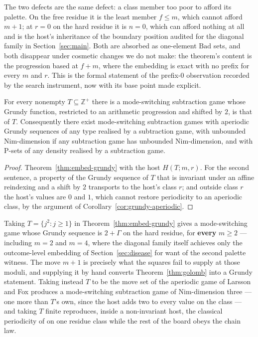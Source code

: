 \begin{remark}\label{rem:two-defects}
The two defects are the same defect: a class member too poor to afford
its palette. On the free residue it is the least member $f \le m$, which
cannot afford $m+1$; at $r = 0$ on the hard residue it is $n = 0$, which
can afford nothing at all and is the host's inheritance of the boundary
position audited for the diagonal family in Section~\ref{sec:main}. Both
are absorbed as one-element $\mathrm{Bad}$ sets, and both disappear under
cosmetic changes we do not make: the theorem's content is the progression
based at $f + m$, where the embedding is exact with no prefix for every
$m$ and $r$. This is the formal statement of the prefix-$0$ observation
recorded by the search instrument, now with its base point made explicit.
\end{remark}

\begin{corollary}\label{cor:can-do}
For every nonempty $T \subseteq \mathbb{Z}^+$ there is a mode-switching
subtraction game whose Grundy function, restricted to an arithmetic
progression and shifted by $2$, is that of $T$. Consequently there exist
mode-switching subtraction games with aperiodic Grundy sequences of any
type realised by a subtraction game, with unbounded Nim-dimension if any
subtraction game has unbounded Nim-dimension, and with P-sets of any
density realised by a subtraction game.
\end{corollary}
\begin{proof}
Theorem~\ref{thm:embed-grundy} with the host $H(T; m, r)$. For the second
sentence, a property of the Grundy sequence of $T$ that is invariant
under an affine reindexing and a shift by $2$ transports to the host's
class $r$; and outside class $r$ the host's values are $0$ and $1$, which
cannot restore periodicity to an aperiodic class, by the argument of
Corollary~\ref{cor:grundy-aperiodic}.
\end{proof}

\begin{remark}\label{rem:squares-host}
Taking $T = \{j^2 : j \ge 1\}$ in Theorem~\ref{thm:embed-grundy} gives a
mode-switching game whose Grundy sequence is $2 + \Gamma$ on the hard
residue, for \textbf{every} $m \ge 2$ --- including $m = 2$ and $m = 4$,
where the diagonal family itself achieves only the outcome-level
embedding of Section~\ref{sec:disease} for want of the second palette
witness. The move $m+1$ is precisely what the squares fail to supply at
those moduli, and supplying it by hand converts
Theorem~\ref{thm:golomb} into a Grundy statement. Taking instead $T$ to
be the move set of the aperiodic game of Larsson and Fox
\cite{larsson-fox} produces a mode-switching subtraction game of
Nim-dimension three --- one more than $T$'s own, since the host adds two
to every value on the class --- and taking $T$ finite reproduces, inside a
non-invariant host, the classical periodicity of \cite{golomb} on one
residue class while the rest of the board obeys the chain law.
\end{remark}


